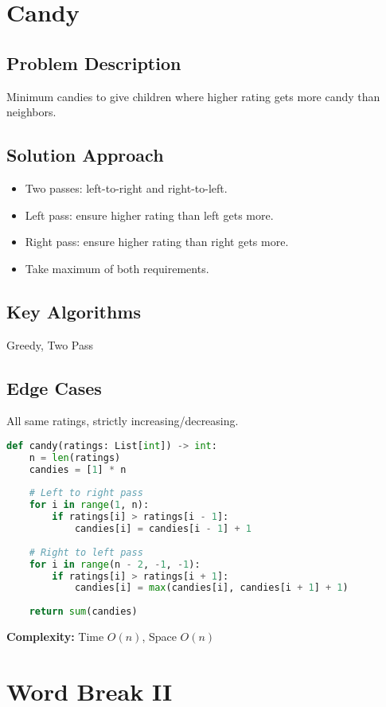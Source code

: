\documentclass[10pt, a4paper]{article}
\begin{document}
\section{Candy}
\subsection*{Problem Description}
Minimum candies to give children where higher rating gets more candy than neighbors.

\subsection*{Solution Approach}
\begin{itemize}
    \item Two passes: left-to-right and right-to-left.
    \item Left pass: ensure higher rating than left gets more.
    \item Right pass: ensure higher rating than right gets more.
    \item Take maximum of both requirements.
\end{itemize}

\subsection*{Key Algorithms}
Greedy, Two Pass

\subsection*{Edge Cases}
All same ratings, strictly increasing/decreasing.

\begin{lstlisting}[language=Python]
def candy(ratings: List[int]) -> int:
    n = len(ratings)
    candies = [1] * n
    
    # Left to right pass
    for i in range(1, n):
        if ratings[i] > ratings[i - 1]:
            candies[i] = candies[i - 1] + 1
    
    # Right to left pass
    for i in range(n - 2, -1, -1):
        if ratings[i] > ratings[i + 1]:
            candies[i] = max(candies[i], candies[i + 1] + 1)
    
    return sum(candies)
\end{lstlisting}
\textbf{Complexity:} Time $O(n)$, Space $O(n)$

\section{Word Break II}
\end{document}
